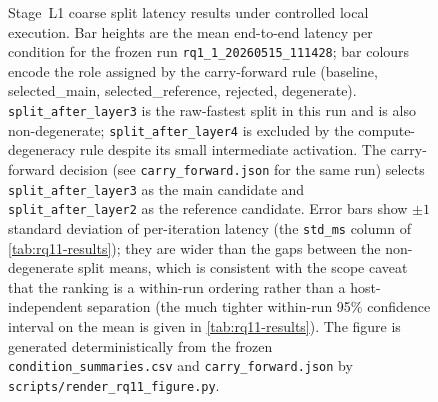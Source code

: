 \begin{table}[htbp]
\centering
\caption[Stage~L1 latency, dispersion, and overhead summary]{Stage~L1 summary of mean latency, dispersion, descriptive within-run per-iteration 95\% confidence interval on the mean, and overhead vs.\ monolithic. Source:
\texttt{condition\_summaries.csv} in
\texttt{rq1\_1\_20260515\_111428}. Confidence intervals are reported from the same artifact's \texttt{ci95\_lower\_ms} / \texttt{ci95\_upper\_ms} columns and summarise per-iteration variation within this run.}
\label{tab:rq11-results}
\end{table}

\begin{figure}[htbp]
\centering
\resizebox{0.92\textwidth}{!}{%

}
\caption[Stage~L1 coarse split latency results]{Stage~L1 coarse split latency results under controlled local execution. Bar heights are the mean end-to-end latency per condition for the frozen run \texttt{rq1\_1\_20260515\_111428}; bar colours encode the role assigned by the carry-forward rule (baseline, selected\_main, selected\_reference, rejected, degenerate). \texttt{split\_after\_layer3} is the raw-fastest split in this run and is also non-degenerate; \texttt{split\_after\_layer4} is excluded by the compute-degeneracy rule despite its small intermediate activation. The carry-forward decision (see \texttt{carry\_forward.json} for the same run) selects \texttt{split\_after\_layer3} as the main candidate and \texttt{split\_after\_layer2} as the reference candidate. Error bars show $\pm 1$ standard deviation of per-iteration latency (the \texttt{std\_ms} column of \cref{tab:rq11-results}); they are wider than the gaps between the non-degenerate split means, which is consistent with the scope caveat that the ranking is a within-run ordering rather than a host-independent separation (the much tighter within-run 95\% confidence interval on the mean is given in \cref{tab:rq11-results}). The figure is generated deterministically from the frozen \texttt{condition\_summaries.csv} and \texttt{carry\_forward.json} by \texttt{scripts/render\_rq11\_figure.py}.}
\label{fig:rq11_coarse_split_results}
\end{figure}

